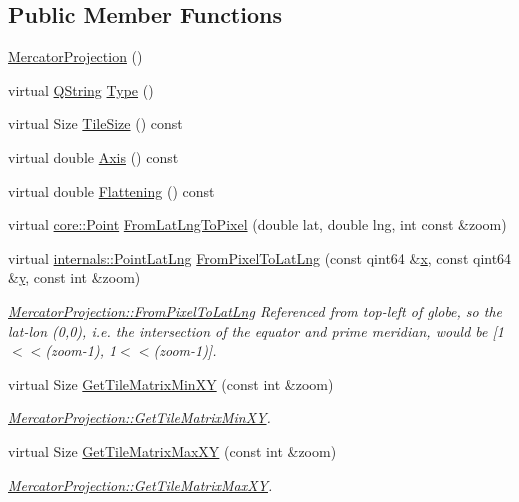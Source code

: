 \subsection*{\-Public \-Member \-Functions}
\begin{DoxyCompactItemize}
\item 
\hyperlink{group___o_p_map_widget_gacccd26328cbdd182922e0a0b2e265529}{\-Mercator\-Projection} ()
\item 
virtual \hyperlink{group___u_a_v_objects_plugin_gab9d252f49c333c94a72f97ce3105a32d}{\-Q\-String} \hyperlink{group___o_p_map_widget_gaefd6d064dd9c4c6cfc431ead163f706a}{\-Type} ()
\item 
virtual \-Size \hyperlink{group___o_p_map_widget_gab8dee05993ebd618b81c24cb3548076a}{\-Tile\-Size} () const 
\item 
virtual double \hyperlink{group___o_p_map_widget_ga982d1100874717420bf3ab65e74c9c9d}{\-Axis} () const 
\item 
virtual double \hyperlink{group___o_p_map_widget_ga85c35978f6b64944591d25a095fc8e4d}{\-Flattening} () const 
\item 
virtual \hyperlink{structcore_1_1_point}{core\-::\-Point} \hyperlink{group___o_p_map_widget_ga4e5e9d139c245de8a1278e83746ed240}{\-From\-Lat\-Lng\-To\-Pixel} (double lat, double lng, int const \&zoom)
\item 
virtual \hyperlink{structinternals_1_1_point_lat_lng}{internals\-::\-Point\-Lat\-Lng} \hyperlink{group___o_p_map_widget_gaaa80928cf51f4c3a7e860678a7bf51ee}{\-From\-Pixel\-To\-Lat\-Lng} (const qint64 \&\hyperlink{_o_p_plots_8m_a9336ebf25087d91c818ee6e9ec29f8c1}{x}, const qint64 \&\hyperlink{_o_p_plots_8m_a2fb1c5cf58867b5bbc9a1b145a86f3a0}{y}, const int \&zoom)
\begin{DoxyCompactList}\small\item\em \hyperlink{group___o_p_map_widget_gaaa80928cf51f4c3a7e860678a7bf51ee}{\-Mercator\-Projection\-::\-From\-Pixel\-To\-Lat\-Lng} \-Referenced from top-\/left of globe, so the lat-\/lon (0,0), i.\-e. the intersection of the equator and prime meridian, would be \mbox{[}1$<$$<$(zoom-\/1), 1$<$$<$(zoom-\/1)\mbox{]}. \end{DoxyCompactList}\item 
virtual \-Size \hyperlink{group___o_p_map_widget_ga9596b6c85652a05e732147c5e6e299ee}{\-Get\-Tile\-Matrix\-Min\-X\-Y} (const int \&zoom)
\begin{DoxyCompactList}\small\item\em \hyperlink{group___o_p_map_widget_ga9596b6c85652a05e732147c5e6e299ee}{\-Mercator\-Projection\-::\-Get\-Tile\-Matrix\-Min\-X\-Y}. \end{DoxyCompactList}\item 
virtual \-Size \hyperlink{group___o_p_map_widget_ga4c7d16ae190aea2fd84e2e046b14c39e}{\-Get\-Tile\-Matrix\-Max\-X\-Y} (const int \&zoom)
\begin{DoxyCompactList}\small\item\em \hyperlink{group___o_p_map_widget_ga4c7d16ae190aea2fd84e2e046b14c39e}{\-Mercator\-Projection\-::\-Get\-Tile\-Matrix\-Max\-X\-Y}. \end{DoxyCompactList}\end{DoxyCompactItemize}


